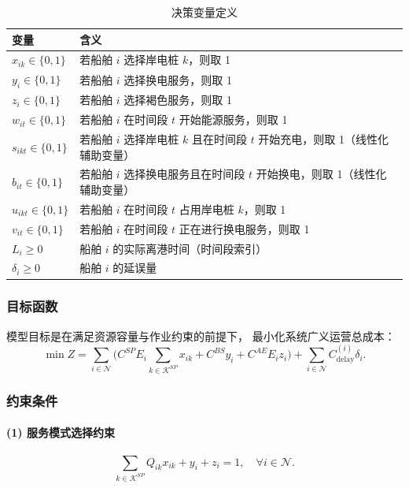 \documentclass[UTF8, a4paper, 12pt]{ctexart}
\begin{document}
\begin{table}[htbp]
\centering
\caption{决策变量定义}
\begin{tabular}{ll}
\toprule
变量 & 含义 \\
\midrule
$x_{ik} \in \{0,1\}$ & 若船舶 $i$ 选择岸电桩 $k$，则取 1 \\
$y_i \in \{0,1\}$ & 若船舶 $i$ 选择换电服务，则取 1 \\
$z_i \in \{0,1\}$ & 若船舶 $i$ 选择褐色服务，则取 1 \\
$w_{it} \in \{0,1\}$ & 若船舶 $i$ 在时间段 $t$ 开始能源服务，则取 1 \\
$s_{ikt} \in \{0,1\}$ & 若船舶 $i$ 选择岸电桩 $k$ 且在时间段 $t$ 开始充电，则取 1（线性化辅助变量） \\
$b_{it} \in \{0,1\}$ & 若船舶 $i$ 选择换电服务且在时间段 $t$ 开始换电，则取 1（线性化辅助变量） \\
$u_{ikt} \in \{0,1\}$ & 若船舶 $i$ 在时间段 $t$ 占用岸电桩 $k$，则取 1 \\
$v_{it} \in \{0,1\}$ & 若船舶 $i$ 在时间段 $t$ 正在进行换电服务，则取 1 \\
$L_i \ge 0$ & 船舶 $i$ 的实际离港时间（时间段索引） \\
$\delta_i \ge 0$ & 船舶 $i$ 的延误量 \\
\bottomrule
\end{tabular}
\end{table}


\subsubsection{目标函数}

模型目标是在满足资源容量与作业约束的前提下，
最小化系统广义运营总成本：
\begin{equation}
\min Z =
\sum_{i \in \mathcal{N}}
\Big(
C^{SP} E_i \sum_{k \in \mathcal{K}^{SP}} x_{ik}
+ C^{BS} y_i
+ C^{AE} E_i z_i
\Big)
+ \sum_{i \in \mathcal{N}} C^{(i)}_{\text{delay}} \delta_i .
\label{eq:obj_24_final}
\end{equation}

\subsubsection{约束条件}

\paragraph{(1) 服务模式选择约束}
\begin{equation}
\sum_{k \in \mathcal{K}^{SP}} Q_{ik} x_{ik} + y_i + z_i = 1,
\quad \forall i \in \mathcal{N}.
\label{eq:mode_24_final}
\end{equation}
\end{document}
